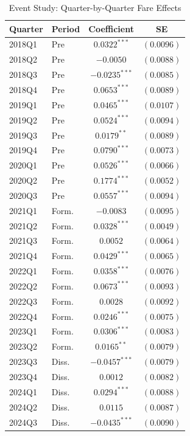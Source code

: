 \begin{table}[H]
\centering
\caption{Event Study: Quarter-by-Quarter Fare Effects}
\label{tab:eventstudy}
\begin{threeparttable}
\begin{tabular}{llcc}
\toprule
Quarter & Period & Coefficient & SE \\
\midrule
2018Q1 & Pre & $0.0322^{***}$ & $(0.0096)$ \\
2018Q2 & Pre & $-0.0050$ & $(0.0088)$ \\
2018Q3 & Pre & $-0.0235^{***}$ & $(0.0085)$ \\
2018Q4 & Pre & $0.0653^{***}$ & $(0.0089)$ \\
2019Q1 & Pre & $0.0465^{***}$ & $(0.0107)$ \\
2019Q2 & Pre & $0.0524^{***}$ & $(0.0094)$ \\
2019Q3 & Pre & $0.0179^{**}$ & $(0.0089)$ \\
2019Q4 & Pre & $0.0790^{***}$ & $(0.0073)$ \\
2020Q1 & Pre & $0.0526^{***}$ & $(0.0066)$ \\
2020Q2 & Pre & $0.1774^{***}$ & $(0.0052)$ \\
2020Q3 & Pre & $0.0557^{***}$ & $(0.0094)$ \\
2021Q1 & Form. & $-0.0083$ & $(0.0095)$ \\
2021Q2 & Form. & $0.0328^{***}$ & $(0.0049)$ \\
2021Q3 & Form. & $0.0052$ & $(0.0064)$ \\
2021Q4 & Form. & $0.0429^{***}$ & $(0.0065)$ \\
2022Q1 & Form. & $0.0358^{***}$ & $(0.0076)$ \\
2022Q2 & Form. & $0.0673^{***}$ & $(0.0093)$ \\
2022Q3 & Form. & $0.0028$ & $(0.0092)$ \\
2022Q4 & Form. & $0.0246^{***}$ & $(0.0075)$ \\
2023Q1 & Form. & $0.0306^{***}$ & $(0.0083)$ \\
2023Q2 & Form. & $0.0165^{**}$ & $(0.0079)$ \\
2023Q3 & Diss. & $-0.0457^{***}$ & $(0.0079)$ \\
2023Q4 & Diss. & $0.0012$ & $(0.0082)$ \\
2024Q1 & Diss. & $0.0294^{***}$ & $(0.0088)$ \\
2024Q2 & Diss. & $0.0115$ & $(0.0087)$ \\
2024Q3 & Diss. & $-0.0435^{***}$ & $(0.0090)$ \\

\end{tabular}
\end{threeparttable}
\end{table}
